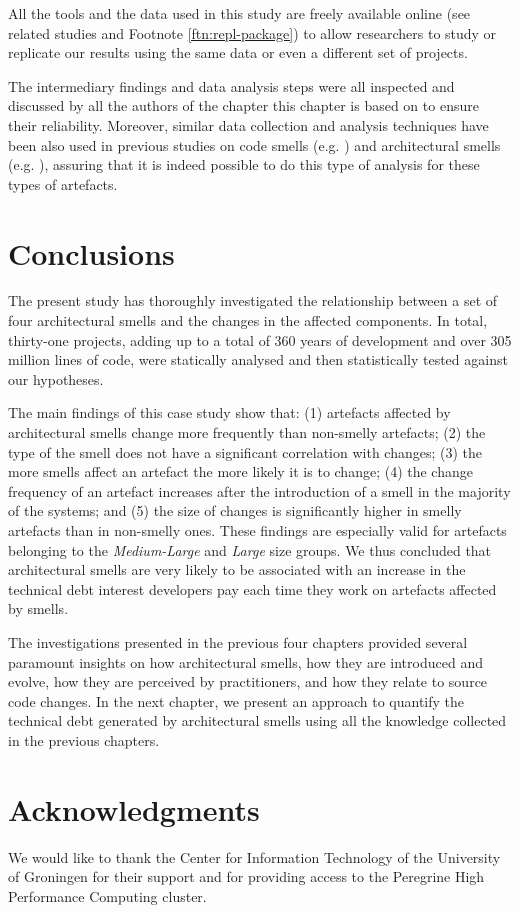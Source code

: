 All the tools and the data used in this study are freely available online (see related studies and Footnote \ref{ftn:repl-package}) to allow researchers to study or replicate our results using the same data or even a different set of projects.

The intermediary findings and data analysis steps were all inspected and discussed by all the authors of the chapter this chapter is based on to ensure their reliability.
Moreover, similar data collection and analysis techniques have been also used in previous studies on code smells (e.g. \cite{Khomh2009}) and architectural smells (e.g. \cite{Le2018}), assuring that it is indeed possible to do this type of analysis for these types of artefacts.

\section{Conclusions}\label{c5:sec:conclusion}
The present study has thoroughly investigated the relationship between a set of four architectural smells and the changes in the affected components.
In total, thirty-one projects, adding up to a total of 360 years of development and  over 305 million lines of code, were statically analysed and then statistically tested against our hypotheses.

The main findings of this case study show that: (1) artefacts affected by architectural smells change more frequently than non-smelly artefacts; (2) the type of the smell does not have a significant correlation with changes; (3) the more smells affect an artefact the more likely it is to change; (4) the change frequency of an artefact increases after the introduction of a smell in the majority of the systems; and (5) the size of changes is significantly higher in smelly artefacts than in non-smelly ones.
These findings are especially valid for artefacts belonging to the \emph{Medium-Large} and \emph{Large} size groups.
We thus concluded that architectural smells are very likely to be associated with an increase in the technical debt interest developers pay each time they work on artefacts affected by smells.

The investigations presented in the previous four chapters provided several paramount insights on how architectural smells, how they are introduced and evolve, how they are perceived by practitioners, and how they relate to source code changes.
In the next chapter, we present an approach to quantify the technical debt generated by architectural smells using all the knowledge collected in the previous chapters.


\section*{Acknowledgments}
We would like to thank the Center for Information Technology of the University of Groningen for their support and for providing access to the Peregrine High Performance Computing cluster.